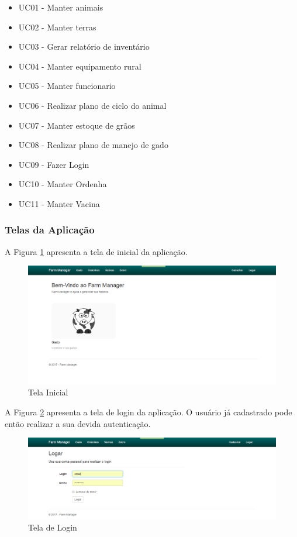\begin{itemize}
	\item UC01 - Manter animais
	\item UC02 - Manter terras
	\item UC03 - Gerar relatório de inventário
	\item UC04 - Manter equipamento rural
	\item UC05 - Manter funcionario
	\item UC06 - Realizar plano de ciclo do animal
	\item UC07 - Manter estoque de grãos
	\item UC08 - Realizar plano de manejo de gado
	\item UC09 - Fazer Login
	\item UC10 - Manter Ordenha
	\item UC11 - Manter Vacina
\end{itemize}

\subsubsection{Telas da Aplicação}

A Figura \ref{tela-inicial} apresenta a tela de inicial da aplicação.

\begin{landscape}
\begin{figure}[h!]
	\centering
	\includegraphics[keepaspectratio=true,scale= 0.5]{figuras/Home-FarmManager.png}
	\caption{Tela Inicial}
	\label{tela-inicial}
\end{figure}
\end{landscape}

A Figura \ref{tela-de-login} apresenta a tela de login da aplicação. O usuário já cadastrado pode então realizar a sua devida autenticação.

\begin{landscape}
\begin{figure}[h!]
	\centering
	\includegraphics[keepaspectratio=true,scale= 0.7]{figuras/Login-FarmManager.PNG}
	\caption{Tela de Login}
	\label{tela-de-login}
\end{figure}
\end{landscape}

